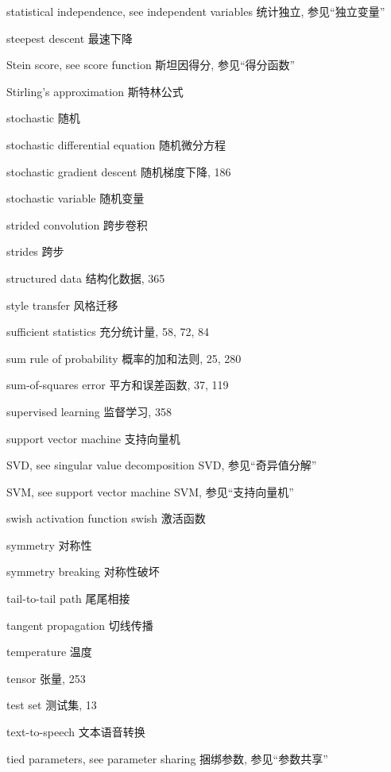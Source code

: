 statistical independence, see independent variables  统计独立, 参见“独立变量” \par
steepest descent  最速下降 \par
Stein score, see score function  斯坦因得分, 参见“得分函数” \par
Stirling's approximation  斯特林公式 \par
stochastic  随机 \par
stochastic differential equation  随机微分方程 \par
stochastic gradient descent  随机梯度下降, 186 \par
stochastic variable  随机变量 \par
strided convolution  跨步卷积 \par
strides  跨步 \par
structured data  结构化数据, 365 \par
style transfer  风格迁移 \par
sufficient statistics  充分统计量, 58, 72, 84 \par
sum rule of probability  概率的加和法则, 25, 280 \par
sum-of-squares error  平方和误差函数, 37, 119 \par
supervised learning  监督学习, 358 \par
support vector machine  支持向量机 \par
SVD, see singular value decomposition  SVD, 参见“奇异值分解” \par
SVM, see support vector machine  SVM, 参见“支持向量机” \par
swish activation function  swish 激活函数 \par
symmetry  对称性 \par
symmetry breaking  对称性破坏 \par
tail-to-tail path  尾尾相接 \par
tangent propagation  切线传播 \par
temperature  温度 \par
tensor  张量, 253 \par
test set  测试集, 13 \par
text-to-speech  文本语音转换 \par
tied parameters, see parameter sharing  捆绑参数, 参见“参数共享” \par
